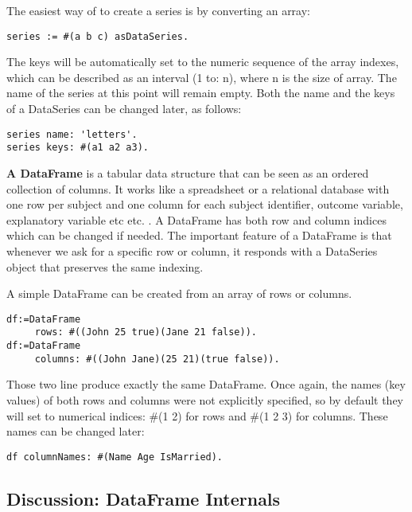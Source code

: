 \documentclass[sigplan]{acmart}
\makeatletter
\newcommand*{\etc}{%
    \@ifnextchar{.}%
        {etc}%
        {etc.\@\xspace}%
}
\makeatother
\begin{document}
The easiest way of to create a series is by converting an array: 

\begin{lstlisting}[basicstyle=\small,language=Smalltalk]
series := #(a b c) asDataSeries.
\end{lstlisting}

The keys will be automatically set to the numeric sequence of the array indexes, which can be described as an interval (1 to: n), where n is the size of array. The name of the series at this point will remain empty. Both the name and the keys of a DataSeries can be changed later, as follows:

\begin{lstlisting}[basicstyle=\small,language=Smalltalk]
series name: 'letters'.
series keys: #(a1 a2 a3).
\end{lstlisting}

\textbf{A DataFrame} is a tabular data structure that can be seen as an ordered collection of columns. It works like a spreadsheet or a relational database with one row per subject and one column for each subject identifier, outcome variable, explanatory variable \etc. A DataFrame has both row and column indices which can be changed if needed. The important feature of a DataFrame is that whenever we ask for a specific row or column, it responds with a DataSeries object that preserves the same indexing.

A simple DataFrame can be created from an array of rows or columns.

\begin{lstlisting}[basicstyle=\small,language=Smalltalk]
df:=DataFrame 
     rows: #((John 25 true)(Jane 21 false)).
df:=DataFrame 
     columns: #((John Jane)(25 21)(true false)).
\end{lstlisting}

Those two line produce exactly the same DataFrame. Once again, the names (key values) of both rows and columns were not explicitly specified, so by default they will set to numerical indices: \#(1 2) for rows and \#(1 2 3) for columns. These names can be changed later:

\begin{lstlisting}[basicstyle=\small,language=Smalltalk]
df columnNames: #(Name Age IsMarried).
\end{lstlisting}

\subsection{Discussion: DataFrame Internals}
\label{sec:internals}
\end{document}
